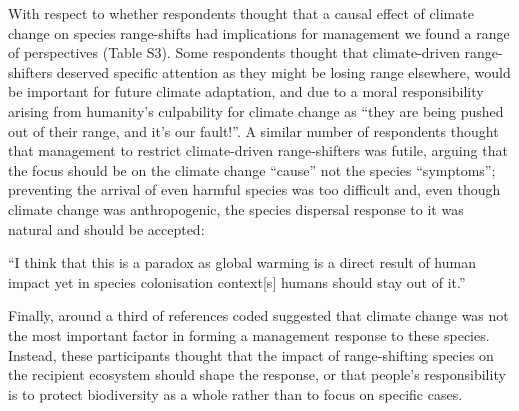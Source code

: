 \documentclass[
]{article}
\begin{document}
With respect to whether respondents thought that a causal effect of
climate change on species range-shifts had implications for management
we found a range of perspectives (Table S3). Some respondents thought
that climate-driven range-shifters deserved specific attention as they
might be losing range elsewhere, would be important for future climate
adaptation, and due to a moral responsibility arising from humanity's
culpability for climate change as ``they are being pushed out of their
range, and it's our fault!''. A similar number of respondents thought
that management to restrict climate-driven range-shifters was futile,
arguing that the focus should be on the climate change ``cause'' not the
species ``symptoms''; preventing the arrival of even harmful species was
too difficult and, even though climate change was anthropogenic, the
species dispersal response to it was natural and should be accepted:

``I think that this is a paradox as global warming is a direct result of
human impact yet in species colonisation context{[}s{]} humans should
stay out of it.''

Finally, around a third of references coded suggested that climate
change was not the most important factor in forming a management
response to these species. Instead, these participants thought that the
impact of range-shifting species on the recipient ecosystem should shape
the response, or that people's responsibility is to protect biodiversity
as a whole rather than to focus on specific cases.
\end{document}
